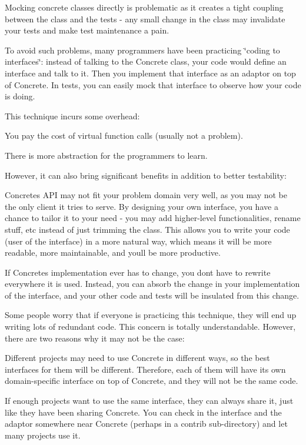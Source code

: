 Mocking concrete classes directly is problematic as it creates a tight coupling between the class and the tests -\/ any small change in the class may invalidate your tests and make test maintenance a pain.

To avoid such problems, many programmers have been practicing \char`\"{}coding
to interfaces\char`\"{}\+: instead of talking to the {\ttfamily Concrete} class, your code would define an interface and talk to it. Then you implement that interface as an adaptor on top of {\ttfamily Concrete}. In tests, you can easily mock that interface to observe how your code is doing.

This technique incurs some overhead\+:


\begin{DoxyItemize}
\item You pay the cost of virtual function calls (usually not a problem).
\item There is more abstraction for the programmers to learn.
\end{DoxyItemize}

However, it can also bring significant benefits in addition to better testability\+:


\begin{DoxyItemize}
\item {\ttfamily Concrete}\textquotesingle{}s A\+PI may not fit your problem domain very well, as you may not be the only client it tries to serve. By designing your own interface, you have a chance to tailor it to your need -\/ you may add higher-\/level functionalities, rename stuff, etc instead of just trimming the class. This allows you to write your code (user of the interface) in a more natural way, which means it will be more readable, more maintainable, and you\textquotesingle{}ll be more productive.
\item If {\ttfamily Concrete}\textquotesingle{}s implementation ever has to change, you don\textquotesingle{}t have to rewrite everywhere it is used. Instead, you can absorb the change in your implementation of the interface, and your other code and tests will be insulated from this change.
\end{DoxyItemize}

Some people worry that if everyone is practicing this technique, they will end up writing lots of redundant code. This concern is totally understandable. However, there are two reasons why it may not be the case\+:


\begin{DoxyItemize}
\item Different projects may need to use {\ttfamily Concrete} in different ways, so the best interfaces for them will be different. Therefore, each of them will have its own domain-\/specific interface on top of {\ttfamily Concrete}, and they will not be the same code.
\item If enough projects want to use the same interface, they can always share it, just like they have been sharing {\ttfamily Concrete}. You can check in the interface and the adaptor somewhere near {\ttfamily Concrete} (perhaps in a {\ttfamily contrib} sub-\/directory) and let many projects use it.
\end{DoxyItemize}

